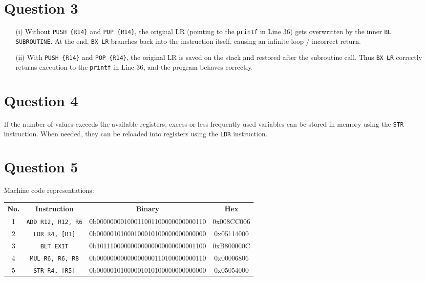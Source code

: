 \documentclass[12pt,a4paper]{article}
\begin{document}
\section*{Question 3}
\begin{itemize}   
\item[(i)] Without \texttt{PUSH \{R14\}} and \texttt{POP \{R14\}}, the original LR (pointing to the \texttt{printf} in Line 36) 
gets overwritten by the inner \texttt{BL SUBROUTINE}. At the end, \texttt{BX LR} branches back into the instruction itself, 
causing an infinite loop / incorrect return.

\item[(ii)] With \texttt{PUSH \{R14\}} and \texttt{POP \{R14\}}, the original LR is saved on the stack and restored 
after the subroutine call. Thus \texttt{BX LR} correctly returns execution to the \texttt{printf} in Line 36, and the program behaves correctly.
\end{itemize}

\section*{Question 4}
If the number of values exceeds the available registers, excess or less frequently used variables can be stored in memory 
using the \texttt{STR} instruction. When needed, they can be reloaded into registers using the \texttt{LDR} instruction.

\section*{Question 5}
Machine code representations:
\begin{longtable}{|c|c|c|c|}
\hline
No. & Instruction & Binary & Hex \\ \hline
1 & \texttt{ADD R12, R12, R6} & 0b00000000100011001100000000000110 & 0x008CC006 \\ \hline
2 & \texttt{LDR R4, [R1]} & 0b00000101000100010100000000000000 & 0x05114000 \\ \hline
3 & \texttt{BLT EXIT} & 0b10111000000000000000000000001100 & 0xB800000C \\ \hline
4 & \texttt{MUL R6, R6, R8} & 0b00000000000000000110100000000110 & 0x00006806 \\ \hline
5 & \texttt{STR R4, [R5]} & 0b00000101000001010100000000000000 & 0x05054000 \\ \hline
\end{longtable}
\end{document}
